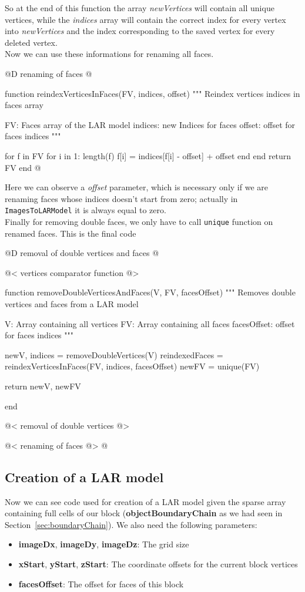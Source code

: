 \documentclass[11pt,oneside]{article}	%
\begin{document}
So at the end of this function the array \textit{newVertices} will contain all unique vertices, while the \textit{indices} array will contain the correct index for every vertex into \textit{newVertices} and the index corresponding to the saved vertex for every deleted vertex.\\

Now we can use these informations for renaming all faces.

@D renaming of faces
@{function reindexVerticesInFaces(FV, indices, offset)
  """
  Reindex vertices indices in faces array

  FV: Faces array of the LAR model
  indices: new Indices for faces
  offset: offset for faces indices
  """

  for f in FV
    for i in 1: length(f)
      f[i] = indices[f[i] - offset] + offset
    end
  end
  return FV
end @}

Here we can observe a \textit{offset} parameter, which is necessary only if we are renaming faces whose indices doesn't start from zero; actually in \texttt{ImagesToLARModel} it is always equal to zero.\\

Finally for removing double faces, we only have to call \texttt{unique} function on renamed faces. This is the final code

@D removal of double vertices and faces
@{@< vertices comparator function @>

function removeDoubleVerticesAndFaces(V, FV, facesOffset)
  """
  Removes double vertices and faces from a LAR model

  V: Array containing all vertices
  FV: Array containing all faces
  facesOffset: offset for faces indices
  """

  newV, indices = removeDoubleVertices(V)
  reindexedFaces = reindexVerticesInFaces(FV, indices, facesOffset)
  newFV = unique(FV)

  return newV, newFV

end

@< removal of double vertices @>

@< renaming of faces @> @}

\subsection{Creation of a LAR model}\label{sec:modelCreation}

Now we can see code used for creation of a LAR model given the sparse array containing full cells of our block (\textbf{objectBoundaryChain} as we had seen in Section~\ref{sec:boundaryChain}). We also need the following parameters:
\begin{itemize}
 \item \textbf{imageDx}, \textbf{imageDy}, \textbf{imageDz}: The grid size
 \item \textbf{xStart}, \textbf{yStart}, \textbf{zStart}: The coordinate offsets for the current block vertices
 \item \textbf{facesOffset}: The offset for faces of this block
\end{itemize}
\end{document}
